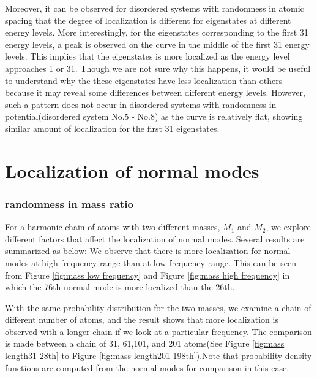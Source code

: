 Moreover, it can be observed for disordered systems with randomness in atomic spacing that the degree of localization is different for eigenstates at different energy levels. More interestingly, for the eigenstates corresponding to the first 31 energy levels, a peak is observed on the curve in the middle of the first 31 energy levels. This implies that the eigenstates is more localized as the energy level approaches 1 or 31. Though we are not sure why this happens, it would be useful to understand why the these eigenstates have less localization than others because it may reveal some differences between different energy levels. However, such a pattern does not occur in disordered systems with randomness in potential(disordered system No.5 - No.8) as the curve is relatively flat, showing similar amount of localization for the first 31 eigenstates.  



\section{Localization of normal modes}
\subsubsection{randomness in mass ratio}

For a harmonic chain of atoms with two different masses, $M_1$ and $M_2$, we explore different factors that affect the localization of normal modes. Several results are summarized as below: 
We observe that there is more localization for normal modes at high frequency range than at low frequency range. This can be seen from Figure \ref{fig:mass low frequency} and Figure \ref{fig:mass high frequency} in which the 76th normal mode is more localized than the 26th. 

With the same probability distribution for the two masses, we examine a chain of different number of atoms, and the result shows that more localization is observed with a longer chain if we look at a particular frequency. The comparison is made between a chain of 31, 61,101, and 201 atoms(See Figure \ref{fig:mass length31 28th} to Figure \ref{fig:mass length201 198th}).Note that probability density functions are computed from the normal modes for comparison in this case.


